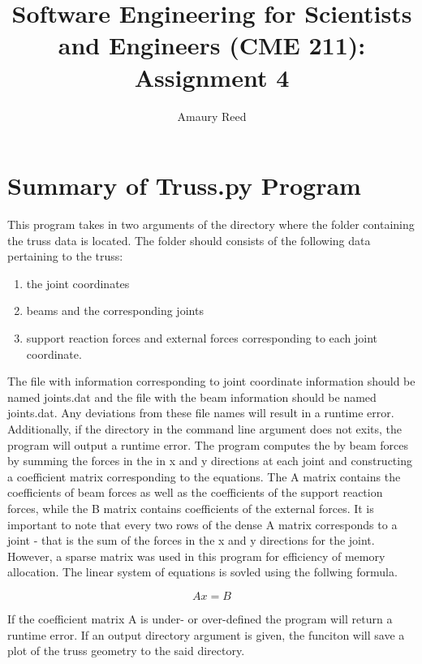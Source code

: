 \documentclass{homework}
\title{Software Engineering for Scientists and Engineers (CME 211): Assignment 4}
\author{Amaury Reed}
\begin{document}
\maketitle

\section{Summary of Truss.py Program}
This program takes in two arguments of the directory where the folder containing the truss data is located. 
The folder should consists of the following data pertaining to the truss: 
\begin{enumerate}
\item the joint coordinates
\item beams and the corresponding joints 
\item support reaction forces and external forces corresponding to each joint coordinate. 
\end{enumerate}
The file with information corresponding to joint coordinate information should be named 
joints.dat and the file with the beam information should be named joints.dat. Any deviations from these file names 
will result in a runtime error. Additionally, if the directory in the command line argument does not exits, the 
program will output a runtime error. The program computes the by beam forces by summing the forces in the in x 
and y directions at each joint and constructing a coefficient matrix corresponding to the equations. The A matrix 
contains the coefficients of beam forces as well as the coefficients of the support reaction forces, while the B 
matrix contains coefficients of the external forces. It is important to note that every two rows of the dense A matrix corresponds to a 
joint - that is the sum of the forces in the x and y directions for the joint. However, a sparse matrix was used in this program for efficiency of memory allocation. The linear system of equations is sovled using the follwing formula. 

\begin{equation}
    Ax = B
\end{equation}

If the coefficient matrix A is under- or over-defined the program will return a 
runtime error. If an output directory argument is given, the funciton will save a plot of the truss geometry to 
the said directory.
\end{document}
